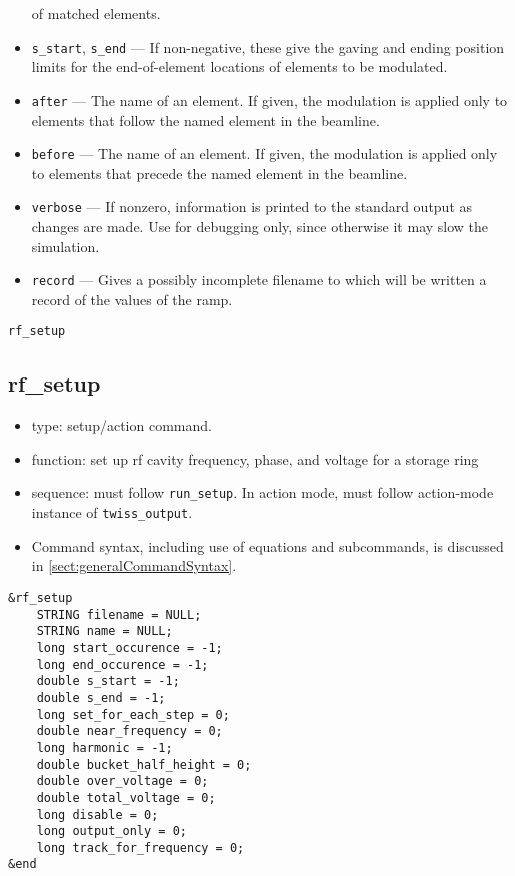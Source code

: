 \documentclass[11pt]{article}
\begin{document}
\begin{itemize}
 of matched elements.
\item \verb|s_start|, \verb|s_end| --- If non-negative, these give the gaving and ending position
 limits for the end-of-element locations of elements to be modulated.
\item \verb|after| --- The name of an element.  If given, the modulation is applied only to elements
 that follow the named element in the beamline.  
\item \verb|before| --- The name of an element.  If given, the modulation is applied only to elements
 that precede the named element in the beamline. 
\item \verb|verbose| --- If nonzero, information is printed to the standard output as changes are
        made.  Use for debugging only, since otherwise it may slow the simulation.
\item \verb|record| --- Gives a possibly incomplete filename to which will be written a record of the values of
  the ramp.
\end{itemize}

\newpage
\begin{center}{\Large\verb|rf_setup|}\end{center}
\subsection{rf\_setup\label{subsec:rfsetup}}

\begin{itemize}
\item type: setup/action command.
\item function: set up rf cavity frequency, phase, and voltage for a storage ring
\item sequence: must follow \verb|run_setup|. In action mode, must follow action-mode instance of \verb|twiss_output|.
\item Command syntax, including use of equations and subcommands, is discussed in \ref{sect:generalCommandSyntax}.
\end{itemize}

\begin{verbatim}
&rf_setup
    STRING filename = NULL;
    STRING name = NULL;
    long start_occurence = -1;
    long end_occurence = -1;
    double s_start = -1;
    double s_end = -1;
    long set_for_each_step = 0;
    double near_frequency = 0; 
    long harmonic = -1;
    double bucket_half_height = 0;
    double over_voltage = 0;
    double total_voltage = 0;
    long disable = 0;
    long output_only = 0;
    long track_for_frequency = 0;
&end
\end{verbatim}
\end{document}
